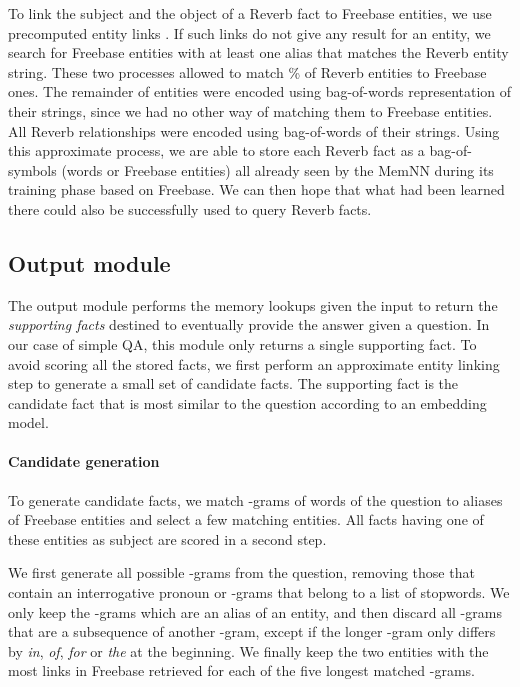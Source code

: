 \documentclass[11pt,a4paper]{article}
\newcommand{\fb}{{\sf Freebase}\xspace}
\newcommand{\rv}{{\sf Reverb}\xspace}
\begin{document}
To link the subject and the object of a \rv fact to \fb entities, we
use precomputed entity
links \cite{lin2012entity}. If such links do not give any result for an
entity, we search for \fb entities with at least one alias that
matches the \rv entity string. These two processes allowed to match
\% of \rv entities to \fb ones. The remainder of entities were
encoded using bag-of-words representation of their strings, since we
had no other way of matching them to \fb entities.
All \rv relationships were encoded using bag-of-words of
their strings.
Using this approximate process, we are able to store each \rv fact as
a bag-of-symbols (words or \fb entities) all already seen by the MemNN
during its training phase based on \fb.
We can then hope that what had been learned there could also be
successfully used to query \rv facts.



\subsection{Output module}
\label{sec:outputModule}
The output module performs the memory lookups given the input to
return the {\it supporting facts} destined to eventually provide the
answer given a question.
In our case of simple QA, this module only returns a single supporting fact.
To avoid scoring all the stored
facts, we first perform an approximate entity linking step to generate
a small set of candidate facts. The supporting fact is the candidate fact that
is most similar to the question according to an embedding model.

\paragraph{Candidate generation}
To generate candidate facts, we match -grams of words of the question to
aliases of \fb entities and select a few matching entities. All facts
having one of these entities as subject are scored in a second step.

We first generate all possible -grams from the question, removing
those that contain an interrogative pronoun or -grams
that belong to a list of stopwords. We only keep the -grams which
are an alias of an entity, and then discard all -grams that are a
subsequence of another -gram, except if the longer -gram only
differs by {\it in}, {\it of}, {\it for} or {\it the} at the
beginning. We finally keep the two entities with the most links in \fb
retrieved for each of the five longest matched -grams.
\end{document}
